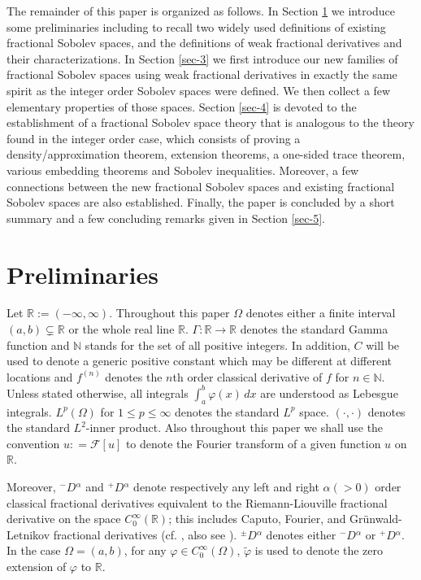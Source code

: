 \documentclass[leqno,final]{siamltex}
\numberwithin{equation}{section}
\newcommand{\Ome}{{\Omega}}
\renewcommand{\(}{\bigl(}
\renewcommand{\)}{\bigr)}
\newcommand{\R}{\mathbb{R}}
\newcommand{\N}{\mathbb{N}}
\begin{document}
    The remainder of this paper is organized as follows.  In Section \ref{sec-2} we
    introduce some preliminaries including to recall two widely used definitions of 
    existing fractional Sobolev spaces, and the definitions of weak fractional 
    derivatives and their characterizations. In Section \ref{sec-3} we first introduce our 
    new families of fractional Sobolev spaces using weak fractional derivatives
    in exactly the same spirit as the integer order Sobolev spaces were defined. 
    We then collect a few elementary properties of those spaces. 
    Section \ref{sec-4} is devoted to the establishment of a fractional Sobolev space theory 
    that is analogous to the theory found in the integer order case, which consists of proving 
    a density/approximation theorem, extension theorems, a one-sided trace theorem, 
    various embedding theorems and Sobolev inequalities.
    Moreover, a few connections between the new fractional Sobolev spaces and existing fractional Sobolev spaces are also established.
    Finally, the paper is concluded by a short summary and a few concluding remarks 
    given in Section \ref{sec-5}.
 
\section{Preliminaries}\label{sec-2}
Let $\R:=(-\infty, \infty)$.  Throughout this paper $\Omega$ denotes either a finite interval $(a,b)\subsetneq\R$ or the whole real line $\R$.  $\Gamma: \R\to \R$ denotes the 
standard Gamma function and $\N$ stands for the set of all positive integers. In addition, 
$C$ will be used to denote a generic positive constant which may be different at different 
locations and $f^{(n)}$ denotes the $n$th order classical derivative of $f$ for $n\in\N$. 
Unless stated otherwise, all integrals $\int_a^b \varphi(x)\, dx$ are understood as Lebesgue  integrals. $L^p(\Ome)$ for $1\leq p\leq \infty$ denotes the standard $L^p$ space. $(\cdot,\cdot)$
denotes the standard $L^2$-inner product. 
%
Also throughout this paper we shall use the convention $\hat{u}: = \mathcal{F}[u]$ to denote 
the Fourier transform of a given function $u$ on $\R$. 

Moreover,  ${^{-}}{D}{^{\alpha}}$ and ${^{+}}{D}{^{\alpha}}$ denote respectively any left 
and right $\alpha (>0)$ order classical fractional derivatives equivalent to the Riemann-Liouville fractional derivative on the space $C^{\infty}_{0}(
\R)$; this includes Caputo, 
Fourier, and Gr\"{u}nwald-Letnikov fractional derivatives (cf. \cite{Samko}, also see \cite[Section 2]{Feng_Sutton}). ${^{\pm}}{D}{^{\alpha}}$ denotes either ${^{-}}{D}{^{\alpha}}$ or ${^{+}}{D}{^{\alpha}}$. In the case $\Ome=(a,b)$, for any $\varphi \in C^{\infty}_{0}(\Omega)$, $\tilde{\varphi}$ is used to denote the zero extension of $\varphi$ to $\R$.
 
\end{document}
